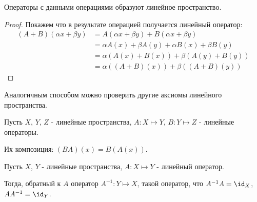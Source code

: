 \begin{remark} \thmslashn

    Операторы с данными операциями образуют линейное пространство.
    \begin{proof} \thmslashn
        
        Покажем что в результате операцией получается линейный оператор:
        \begin{equation*}
            \begin{split}
                (A+B)(\alpha x + \beta y)
                &= A(\alpha x + \beta y) + B(\alpha x + \beta y)\\
                &= \alpha A(x) + \beta A(y) + \alpha B(x) + \beta B(y)\\
                &= \alpha (A(x) + B(x)) + \beta (A(y) + B(y))\\
                &= \alpha ((A+B)(x)) + \beta ((A+B)(y))
            \end{split}
        \end{equation*}
    \end{proof}

    Аналогичным способом можно проверить другие аксиомы линейного пространства.
\end{remark}
\begin{definition} \thmslashn 

    Пусть $X$, $Y$, $Z$ - линейные пространства, $A : X \mapsto Y$, $B : Y \mapsto Z$ - линейные операторы.

    Их композиция: $(BA)(x) = B(A(x))$.
\end{definition}
\begin{definition} \thmslashn 

    Пусть $X$, $Y$ - линейные пространства, $A : X \mapsto Y$ - линейный оператор.

    Тогда, обратный к $A$ оператор $A^{-1} : Y \mapsto X$, такой оператор, что $A^{-1}A = \id_{X}$, $AA^{-1} = \id_{Y}$.
\end{definition}
